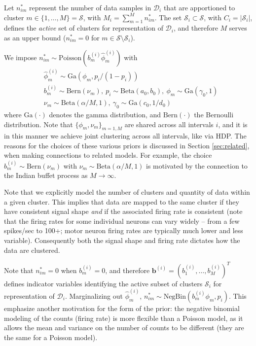 \documentclass[journal]{IEEEtran}
\newcommand{\beqs}{\begin{eqnarray}}
\newcommand{\eeqs}{\end{eqnarray}}
\newcommand{\bv}{\boldsymbol{b}}
\begin{document}
Let $n_{im}^*$ represent the number of data samples in $\bm{\mathcal{D}}_i$ that are apportioned to cluster $m\in\{1,\dots,M\}=\mathcal{S}$, with $M_i=\sum_{m=1}^M n_{im}^*$. The set $\mathcal{S}_i\subset \mathcal{S}$, with $C_i=|\mathcal{S}_i|$, defines the \emph{active} set of clusters for representation of $\bm{\mathcal{D}}_i$, and therefore $M$ serves as an upper bound ($n_{im}^*=0$ for $m\in\mathcal{S}\setminus\mathcal{S}_i$).

We impose $n_{im}^*\sim\mbox{Poisson}(b_m^{(i)}\hat{\phi}_m^{(i)})$ with
\beqs & \hat{\phi}_m^{(i)}\sim \mbox{Ga}(\phi_m,p_i/(1-p_i))\label{eq:gen1}\\& b_m^{(i)}\sim\mbox{Bern}(\nu_m),~p_i\sim\mbox{Beta}(a_0,b_0),~ \phi_m\sim\mbox{Ga}(\gamma_0,1)\\&\nu_m\sim\mbox{Beta}(\alpha/M,1),~\gamma_0\sim\mbox{Ga}(c_0,1/d_0)\label{eq:gen2}\eeqs
where $\mbox{Ga}(\cdot)$ denotes the gamma distribution, and $\mbox{Bern}(\cdot)$ the Bernoulli distribution. Note that $\{\phi_m,\nu_m\}_{m=1,M}$ are shared across all intervals $i$, and it is in this manner we achieve joint clustering across all intervals, like via HDP. The reasons for the choices of these various priors is discussed in Section \ref{sec:related}, when making connections to related models. For example, the choice $b_m^{(i)}\sim\mbox{Bern}(\nu_m)$ with $\nu_m\sim\mbox{Beta}(\alpha/M,1)$ is motivated by the connection to the Indian buffet process \cite{IBP} as $M\rightarrow\infty$.

Note that we explicitly model the number of clusters and quantity of data within a given cluster. This implies that data are mapped to the same cluster if they have consistent signal shape \emph{and} if the associated firing rate is consistent (note that the firing rates for some individual neurons can vary widely -- from a few spikes/sec to 100+; motor neuron firing rates are typically much lower and less variable). Consequently both the signal shape and firing rate dictates how the data are clustered.

Note that $n_{im}^*=0$ when $b_m^{(i)}=0$, and therefore $\bv^{(i)}=(b_1^{(i)},\dots,b_M^{(i)})^T$ defines indicator variables identifying the active subset of clusters $\mathcal{S}_i$ for representation of $\bm{\mathcal{D}}_i$. Marginalizing out $\hat{\phi}_m^{(i)}$, $n_{im}^*\sim\mbox{NegBin}(b_m^{(i)}{\phi}_m,p_i)$. This emphasize another motivation for the form of the prior: the negative binomial modeling of the counts (firing rate) is more flexible than a Poisson model, as it allows the mean and variance on the number of counts to be different (they are the same for a Poisson model).
\end{document}
